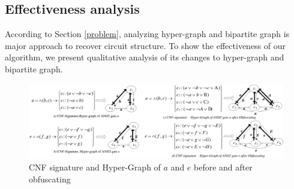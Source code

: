 \documentclass[runningheads,a4paper]{llncs}
\begin{document}

% 

\subsection{Effectiveness analysis}

According to Section \ref{problem}, 
analyzing hyper-graph and bipartite graph is major approach to recover circuit structure. 
To show the effectiveness of our algorithm, 
we present qualitative 
analysis of its changes to hyper-graph and bipartite graph.



\begin{figure}[b]
\centering
\includegraphics[width=13cm]{a6-1}
\caption{CNF signature and Hyper-Graph of $a$ and $e$ before and after obfuscating}
\label{fig_beforeafter}
\end{figure}
\end{document}
